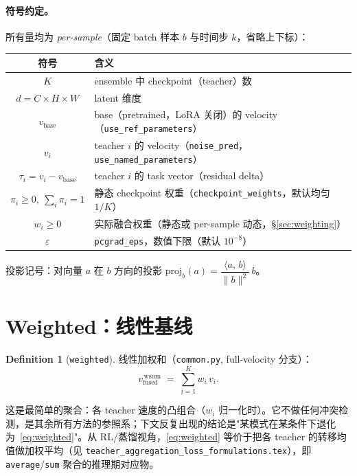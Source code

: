 \documentclass[11pt,a4paper]{article}
\newcommand{\vb}{v_{\mathrm{base}}}
\newcommand{\vfused}{v_{\mathrm{fused}}}
\newcommand{\inner}[2]{\langle #1,\, #2\rangle}
\newcommand{\norm}[1]{\lVert #1\rVert}
\newcommand{\proj}[2]{\mathrm{proj}_{#2}\!\left(#1\right)}
\theoremstyle{plain}
\theoremstyle{definition}
\newtheorem{definition}{Definition}
\begin{document}
\paragraph{符号约定。} 所有量均为 \emph{per-sample}（固定 batch 样本 $b$ 与时间步 $k$，省略上下标）：
\begin{center}
\begin{tabular}{cl}
\toprule
\textbf{符号} & \textbf{含义} \\
\midrule
$K$ & ensemble 中 checkpoint（teacher）数 \\
$d=C\times H\times W$ & latent 维度 \\
$\vb$ & base（pretrained，LoRA 关闭）的 velocity（\texttt{use\_ref\_parameters}） \\
$v_i$ & teacher $i$ 的 velocity（\texttt{noise\_pred}，\texttt{use\_named\_parameters}） \\
$\tau_i=v_i-\vb$ & teacher $i$ 的 task vector（residual delta） \\
$\pi_i\ge0,\ \sum_i\pi_i=1$ & 静态 checkpoint 权重（\texttt{checkpoint\_weights}，默认均匀 $1/K$） \\
$w_i\ge0$ & 实际融合权重（静态或 per-sample 动态，\S\ref{sec:weighting}） \\
$\varepsilon$ & \texttt{pcgrad\_eps}，数值下限（默认 $10^{-8}$） \\
\bottomrule
\end{tabular}
\end{center}

\noindent 投影记号：对向量 $a$ 在 $b$ 方向的投影 $\proj{a}{b}=\dfrac{\inner{a}{b}}{\norm{b}^2}\,b$。

\section{Weighted：线性基线}

\begin{definition}[\texttt{weighted}]
\label{def:weighted}
线性加权和（\texttt{common.py}, full-velocity 分支）：
\begin{equation}
\vfused^{\,\mathrm{wsum}} \;=\; \sum_{i=1}^{K} w_i\, v_i.
\label{eq:weighted}
\end{equation}
\end{definition}

这是最简单的聚合：各 teacher 速度的凸组合（$w_i$ 归一化时）。它不做任何冲突检测，是其余所有方法的参照系；下文反复出现的结论是"某模式在某条件下退化为~\eqref{eq:weighted}"。从 RL/蒸馏视角，\eqref{eq:weighted} 等价于把各 teacher 的转移均值做加权平均（见 \texttt{teacher\_aggregation\_loss\_formulations.tex}），即 \texttt{average}/\texttt{sum} 聚合的推理期对应物。
\end{document}
